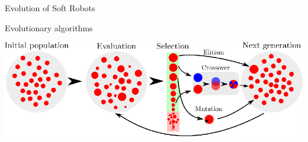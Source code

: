 \documentclass[6pt]{beamer}
\begin{document}
{

\begin{frame}{Evolution {\scriptsize of Soft Robots}}
\begin{block}{Evolutionary algorithms}
\begin{center}
\includegraphics[width=1.0\textwidth]{../Figures/Misc/Evolution.eps}
\end{center}
\end{block}
\end{frame}

}
\end{document}
